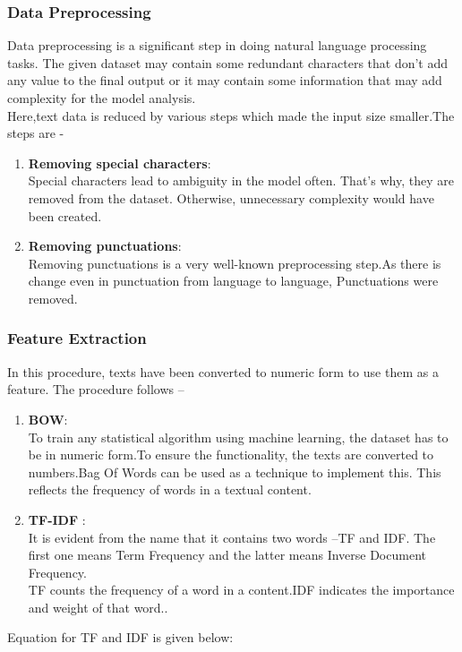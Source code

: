 \documentclass[a4paper,12pt]{article}
\begin{document}
\subsubsection{Data Preprocessing}
Data preprocessing is a significant step in doing natural language processing tasks. The given dataset may contain some redundant characters that don't add any value to the final output or it may contain some information that may add complexity for the model analysis.\\

Here,text data is reduced by various steps which made the input size smaller.The steps are -
\vspace{0.2cm}
\begin{enumerate}
    \item \textbf{Removing special characters}:\\
    Special characters lead to ambiguity in the model often. That's why, they are removed from the dataset. Otherwise, unnecessary complexity would have been created.
    \vspace{0.5cm}
    \item \textbf{Removing punctuations}: \\
    Removing punctuations is a very well-known preprocessing step.As there is change even in punctuation from language to language, Punctuations were removed.
\end{enumerate}

\subsubsection{Feature Extraction}
In this procedure, texts have been converted to numeric form to use them as a feature. The procedure follows – \\
\begin{enumerate}
    \item \textbf{BOW}:\\
    To train any statistical algorithm using machine learning, the dataset has to be in numeric form.To ensure the functionality, the texts are converted to numbers.Bag Of Words can be used as a technique to implement this. This reflects the frequency of words in a textual content\cite{BOW}.
    \vspace{0.3cm}
    \item \textbf{TF-IDF} : \\
    It is evident from the name that it contains two words –TF and IDF. The first one means Term Frequency and the latter means Inverse Document Frequency.\\
    TF counts the frequency of a word in a content.IDF indicates the importance and weight of that word..
\end{enumerate}
    Equation for TF and IDF is given below:
\end{document}
